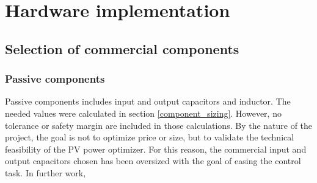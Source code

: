 
\chapter{Hardware implementation} \label{ch:hardware_implementation}


\section{Selection of commercial components}

\subsection{Passive components}

Passive components includes input and output capacitors and inductor. The needed values were calculated in section \ref{component_sizing}. However, no tolerance or safety margin are included in those calculations. By the nature of the project, the goal is not to optimize price or size, but to validate the technical feasibility of the PV power optimizer. For this reason, the commercial input and output capacitors chosen has been oversized with the goal of easing the control task. In further work,


